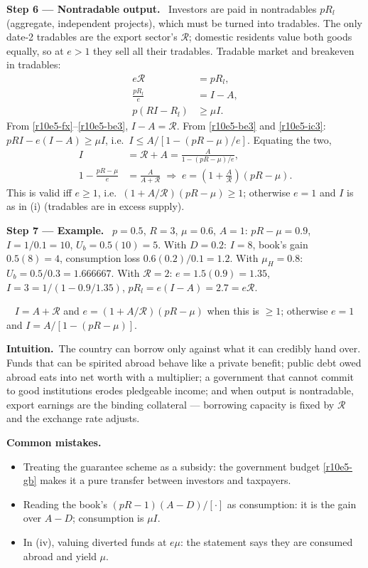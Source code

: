 \documentclass[11pt,a4paper]{article}
\newcommand{\step}[2]{\par\medskip\noindent\textbf{Step #1 --- #2.}~}
\newcommand{\intuition}{\par\medskip\noindent\textbf{Intuition.}~}
\newcommand{\answer}[1]{\par\smallskip\noindent\fbox{\textbf{Answer\if\relax\detokenize{#1}\relax\else\ #1\fi.}}~}
\newcommand{\pitfalls}{\par\medskip\noindent\textbf{Common mistakes.}}
\newcommand{\Rc}{\mathcal{R}}
\begin{document}
\step{6}{Nontradable output} Investors are paid in nontradables $pR_l$ (aggregate, independent projects), which must be turned into tradables. The only date-2 tradables are the export sector's $\Rc$; domestic residents value both goods equally, so at $e>1$ they sell all their tradables. Tradable market and breakeven in tradables:
\begin{align}
  e\Rc &= pR_l, \label{r10e5-fx}\\
  \frac{pR_l}{e} &= I-A, \label{r10e5-be3}\\
  p(RI-R_l) &\geq \mu I. \label{r10e5-ic3}
\end{align}
From \eqref{r10e5-fx}--\eqref{r10e5-be3}, $I-A=\Rc$. From \eqref{r10e5-be3} and \eqref{r10e5-ic3}: $pRI-e(I-A)\geq\mu I$, i.e.\ $I\leq A/[1-(pR-\mu)/e]$. Equating the two,
\begin{align}
  I &= \Rc+A = \frac{A}{1-(pR-\mu)/e}, \label{r10e5-I4}\\
  1-\frac{pR-\mu}{e} &= \frac{A}{A+\Rc} \;\Longrightarrow\; e=\left(1+\frac{A}{\Rc}\right)(pR-\mu). \label{r10e5-e}
\end{align}
This is valid iff $e\geq1$, i.e.\ $(1+A/\Rc)(pR-\mu)\geq1$; otherwise $e=1$ and $I$ is as in (i) (tradables are in excess supply).

\step{7}{Example} $p=0.5$, $R=3$, $\mu=0.6$, $A=1$: $pR-\mu=0.9$, $I=1/0.1=10$, $U_b=0.5(10)=5$. With $D=0.2$: $I=8$, book's gain $0.5(8)=4$, consumption loss $0.6(0.2)/0.1=1.2$. With $\mu_H=0.8$: $U_b=0.5/0.3=1.666667$. With $\Rc=2$: $e=1.5(0.9)=1.35$, $I=3=1/(1-0.9/1.35)$, $pR_l=e(I-A)=2.7=e\Rc$.

\answer{(iv)} $I=A+\Rc$ and $e=(1+A/\Rc)(pR-\mu)$ when this is $\geq1$; otherwise $e=1$ and $I=A/[1-(pR-\mu)]$.

\intuition The country can borrow only against what it can credibly hand over. Funds that can be spirited abroad behave like a private benefit; public debt owed abroad eats into net worth with a multiplier; a government that cannot commit to good institutions erodes pledgeable income; and when output is nontradable, export earnings are the binding collateral --- borrowing capacity is fixed by $\Rc$ and the exchange rate adjusts.

\pitfalls
\begin{itemize}
  \item Treating the guarantee scheme as a subsidy: the government budget \eqref{r10e5-gb} makes it a pure transfer between investors and taxpayers.
  \item Reading the book's $(pR-1)(A-D)/[\cdot]$ as consumption: it is the gain over $A-D$; consumption is $\mu I$.
  \item In (iv), valuing diverted funds at $e\mu$: the statement says they are consumed abroad and yield $\mu$.
\end{itemize}
\end{document}
